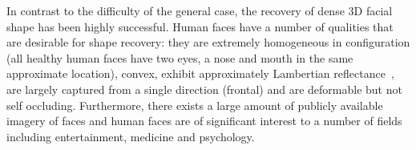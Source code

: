In contrast to the difficulty of the general case, the recovery of dense 3D
facial shape has been highly successful. Human faces have a number of qualities
that are desirable for shape recovery: they are extremely homogeneous in
configuration (all healthy human faces have two eyes, a nose and mouth in the
same approximate location), convex, exhibit approximately Lambertian 
reflectance~\cite{Sirovich:1987te,RefWorks:314,Basri:2003ie,RefWorks:98,Hallinan:1994dz,ramamoorthi2002analytic,ramamoorthi2001relationship,shashua1997photometric,moses1993face},
are largely captured from a single direction (frontal) and are deformable
but not self occluding. Furthermore, there exists a large amount of publicly
available imagery of faces and human faces are of significant interest to a 
number of fields including entertainment, medicine and psychology.
